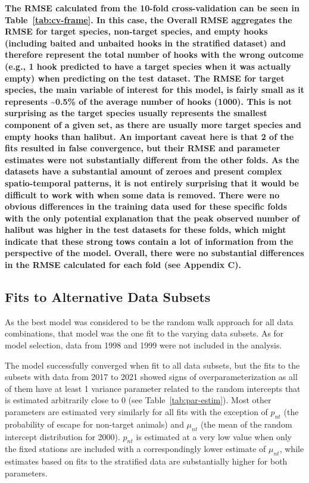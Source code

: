 \documentclass[12pt]{article}\usepackage[]{graphicx}\usepackage[]{color}
\begin{document}
\textbf{The RMSE calculated from the 10-fold cross-validation can be seen in Table~\ref{tab:cv-frame}. In this case, the Overall RMSE aggregates the RMSE for target species, non-target species, and empty hooks (including baited and unbaited hooks in the stratified dataset) and therefore represent the total number of hooks with the wrong outcome (e.g., 1 hook predicted to have a target species when it was actually empty) when predicting on the test dataset. The RMSE for target species, the main variable of interest for this model, is fairly small as it represents \textasciitilde0.5\% of the average number of hooks (1000). This is not surprising as the target species usually represents the smallest component of a given set, as there are usually more target species and empty hooks than halibut. An important caveat here is that 2 of the fits resulted in false convergence, but their RMSE and parameter estimates were not substantially different from the other folds. As the datasets have a substantial amount of zeroes and present complex spatio-temporal patterns, it is not entirely surprising that it would be difficult to work with when some data is removed. There were no obvious differences in the training data used for these specific folds with the only potential explanation that the peak observed number of halibut was higher in the test datasets for these folds, which might indicate that these strong tows contain a lot of information from the perspective of the model. Overall, there were no substantial differences in the RMSE calculated for each fold (see Appendix C).}

\hypertarget{fits-to-alternative-data-subsets}{%
\subsection{Fits to Alternative Data Subsets}\label{fits-to-alternative-data-subsets}}

As the best model was considered to be the random walk approach for all data combinations, that model was the one fit to the varying data subsets. As for model selection, data from 1998 and 1999 were not included in the analysis.

The model successfully converged when fit to all data subsets, but the fits to the subsets with data from 2017 to 2021 showed signs of overparameterization as all of them have at least 1 variance parameter related to the random intercepts that is estimated arbitrarily close to 0 (see Table~\ref{tab:par-estim}). Most other parameters are estimated very similarly for all fits with the exception of \(p_{nt}\) (the probability of escape for non-target animals) and \(\mu_{nt}\) (the mean of the random intercept distribution for 2000). \(p_{nt}\) is estimated at a very low value when only the fixed stations are included with a correspondingly lower estimate of \(\mu_{nt}\), while estimates based on fits to the stratified data are substantially higher for both parameters.
\end{document}
